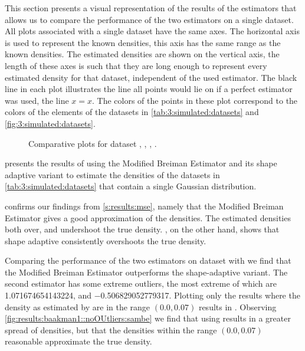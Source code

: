 This section presents a visual representation of the results of the estimators that allows us to compare the performance of the two estimators on a single dataset. All plots associated with a single dataset have the same axes. The horizontal axis is used to represent the known densities, this axis has the same range as the known densities. The estimated densities are shown on the vertical axis, the length of these axes is such that they are long enough to represent every estimated density for that dataset, independent of the used estimator. The black line in each plot illustrates the line all points would lie on if a perfect estimator was used, \ie the line $x = x$. The colors of the points in these plot correspond to the colors of the elements of the datasets in \cref{tab:3:simulated:datasets} and \cref{fig:3:simulated:datasets}.

	\begin{figure}
		\centering
		
		\caption{Comparative plots for dataset \ferdosiOne, \baakmanOne, \baakmanFour, \baakmanFive.}
		\label{fig:4:results:singleSphere}
	\end{figure}

	 presents the results of using the Modified Breiman Estimator and its shape adaptive variant to estimate the densities of the datasets in \cref{tab:3:simulated:datasets} that contain a single Gaussian distribution. 

		 confirms our findings from \cref{s:results:mse}, namely that the Modified Breiman Estimator gives a good approximation of the densities. The estimated densities both over, and undershoot the true density. , on the other hand, shows that shape adaptive \mbe consistently overshoots the true density. 

		Comparing the performance of the two estimators on dataset \numberstringnum{\baakmanOneNum} with  we find that the Modified Breiman Estimator outperforms the shape-adaptive variant. The second estimator has some extreme outliers, the most extreme of which are \num{1.071674654143224}, and \num{-0.506829052779317}. 
		Plotting only the results where the density as estimated by \sambe are in the range $\left(\num{0.0}, \num[round-precision=1]{0.07} \right)$ results in . Observing \cref{fig:results:baakman1::noOUtliers:sambe} we find that using \sambe results in a greater spread of densities, but that the densities within the range $\left(\num[round-precision=1]{0.0}, \num[round-precision=1]{0.07} \right)$ reasonable approximate the true density.

